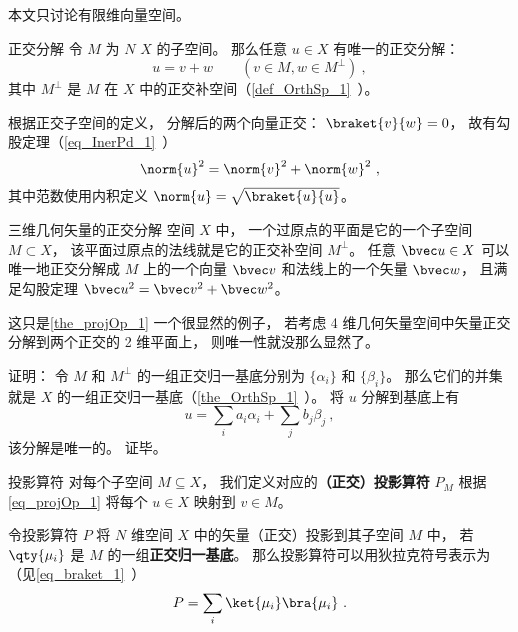 

本文只讨论有限维向量空间。

\begin{theorem}{正交分解}\label{the_projOp_1}
令 $M$ 为 $N$  $X$ 的子空间。 那么任意 $u\in X$ 有唯一的正交分解：
\begin{equation}\label{eq_projOp_1}
u = v + w \qquad (v\in M, w\in M^\bot)~,
\end{equation}
其中 $M^\bot$ 是 $M$ 在 $X$ 中的正交补空间（\autoref{def_OrthSp_1}~）。
\end{theorem}
根据正交子空间的定义， 分解后的两个向量正交： $\braket{v}{w} = 0$， 故有勾股定理（\autoref{eq_InerPd_1}~）
\begin{equation}
\norm{u}^2 = \norm{v}^2 + \norm{w}^2~,
\end{equation}
其中范数使用内积定义 $\norm{u} = \sqrt{\braket{u}{u}}$。

\begin{example}{三维几何矢量的正交分解}
 空间 $X$ 中， 一个过原点的平面是它的一个子空间 $M \subset X$， 该平面过原点的法线就是它的正交补空间 $M^\bot$。  任意 $\bvec u \in X$ 可以唯一地正交分解成 $M$ 上的一个向量 $\bvec v$ 和法线上的一个矢量 $\bvec w$， 且满足勾股定理 $\bvec u^2 = \bvec v^2 + \bvec w^2$。

这只是\autoref{the_projOp_1} 一个很显然的例子， 若考虑 4 维几何矢量空间中矢量正交分解到两个正交的 2 维平面上， 则唯一性就没那么显然了。
\end{example}

证明： 令 $M$ 和 $M^\bot$ 的一组正交归一基底分别为 $\{\alpha_i\}$ 和 $\{\beta_i\}$。 那么它们的并集就是 $X$ 的一组正交归一基底（\autoref{the_OrthSp_1}~）。 将 $u$ 分解到基底上有
\begin{equation}
u = \sum_i a_i \alpha_i + \sum_j b_j \beta_j~,
\end{equation}
该分解是唯一的。 证毕。

\begin{definition}{投影算符}
对每个子空间 $M\subseteq X$， 我们定义对应的\textbf{（正交）投影算符} $P_M$ 根据\autoref{eq_projOp_1} 将每个 $u\in X$ 映射到 $v\in M$。
\end{definition}

\begin{theorem}{}
令投影算符 $P$ 将 $N$ 维空间 $X$ 中的矢量（正交）投影到其子空间 $M$ 中， 若 $\qty{\mu_i}$ 是 $M$ 的一组\textbf{正交归一基底}。 那么投影算符可以用狄拉克符号表示为（见\autoref{eq_braket_1}~）
\begin{equation}
P = \sum_i \ket{\mu_i}\bra{\mu_i}~.
\end{equation}
\end{theorem}



